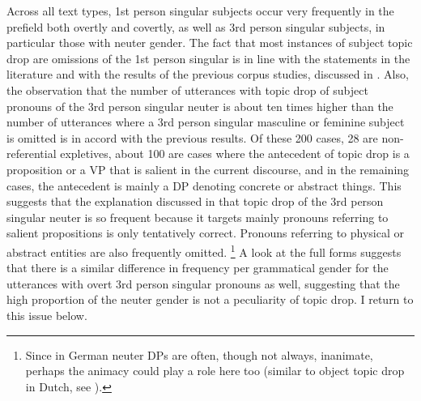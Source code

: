 \noindent
Across all text types, 1st person singular subjects occur very frequently in the prefield both overtly and covertly, as well as 3rd person singular subjects, in particular those with neuter gender.
The fact that most instances of subject topic drop are omissions of the 1st person singular is in line with the statements in the literature and with the results of the previous corpus studies, discussed in .
Also, the observation that the number of utterances with topic drop of subject pronouns of the 3rd person singular neuter is about ten times higher than the number of utterances where a 3rd person singular masculine or feminine subject is omitted is in accord with the previous results.
Of these 200 cases, 28 are non-referential expletives,  about 100 are cases where the antecedent  of topic drop is a proposition or a VP  that is salient  in the current discourse, and in the remaining cases, the antecedent  is mainly a DP denoting concrete or abstract things.
This suggests that the explanation discussed in  that topic drop of the 3rd person singular neuter is so frequent because it targets mainly pronouns referring to salient  propositions is only tentatively correct.
Pronouns referring to physical or abstract entities are also frequently omitted.%
\footnote{Since in German neuter DPs are often, though not always, inanimate, perhaps the animacy  could play a role here too (similar to object topic drop in Dutch,  see ).}
%
A look at the full forms suggests that there is a similar difference in frequency per grammatical gender for the utterances with overt 3rd person singular pronouns as well, suggesting that the high proportion of the neuter gender is not a peculiarity of topic drop.
I return to this issue below.  
  
